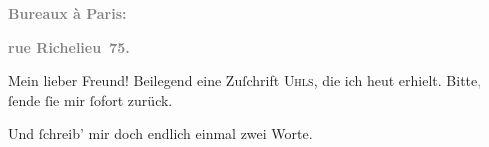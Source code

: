 \pstart
           \begin{otherlanguage}{french}\textcolor{gray}{\textbf{\textbf{Bureaux à Paris:}}}\end{otherlanguage}\pend
           
\pstart
           \begin{otherlanguage}{french}\textcolor{gray}{\textbf{\textbf{rue Richelieu 75.}}}\end{otherlanguage}\pend
           
\pstart\center{}Mein lieber Freund!\pend\vspace{0.5em}
\pstart
           Beilegend eine Zuſchrift \textsc{Uhls}, die ich heut erhielt. Bitte\textcolor{gray}{,} ſende ſie mir ſofort zurück.\pend
           
\pstart
           Und ſchreib’ mir doch endlich einmal zwei Worte.\pend
           
